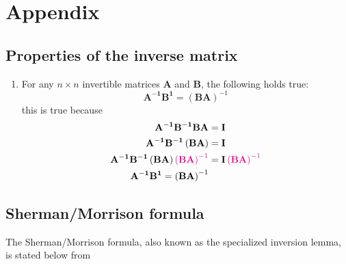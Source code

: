\documentclass[12pt]{article}
\newcommand{\mat}[1]{\mathbf{#1}}
\newcommand{\parentheses}[1]{\left(#1\right)}
\newcommand{\magenta}[1]{\color{magenta}#1\color{black}}
\begin{document}
\section{Appendix}
\subsection{Properties of the inverse matrix}
\begin{enumerate}
    \item For any $n\times n$ invertible matrices $\mat{A}$ and $\mat{B}$, the following holds true:
    \begin{equation}
        \mat{A^{-1}} \mat{B^{1}} = \left(\mat{B A}\right)^{-1}
    \end{equation}
    this is true because
    \begin{equation*}
    \begin{aligned}
        \mat{A^{-1}}\mat{B^{-1}}\mat{B A} &= \mat{I}\\
        \mat{A^{-1}}\mat{B^{-1}}\parentheses{\mat{B A}} &= \mat{I}\\
        \mat{A^{-1}}\mat{B^{-1}}\parentheses{\mat{B A}}\magenta{\parentheses{\mat{B A}}^{-1}} &= \mat{I}\magenta{\parentheses{\mat{B A}}^{-1}} \\
        \mat{A^{-1}} \mat{B^{1}} = \left(\mat{B A}\right)^{-1}
    \end{aligned}
    \end{equation*}
\end{enumerate}



\subsection{Sherman/Morrison formula}
The Sherman/Morrison formula, also known as the specialized inversion lemma, is stated below from \cite[p.~50]{bongard2006probabilistic}
\end{document}
